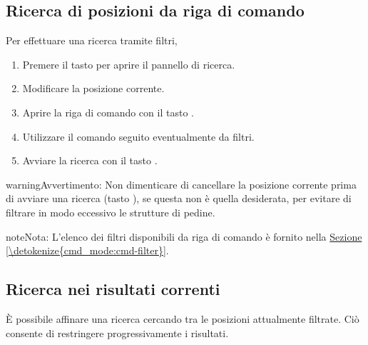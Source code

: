 \documentclass[letterpaper,10pt,italian]{sphinxmanual}
\begin{document}
\subsection{Ricerca di posizioni da riga di comando}
\label{\detokenize{annexe_filtres:recherche-de-positions-en-ligne-de-commande}}
\sphinxAtStartPar
Per effettuare una ricerca tramite filtri,
\begin{enumerate}
%
\item {} 
\sphinxAtStartPar
Premere il tasto  per aprire il pannello di ricerca.

\item {} 
\sphinxAtStartPar
Modificare la posizione corrente.

\item {} 
\sphinxAtStartPar
Aprire la riga di comando con il tasto .

\item {} 
\sphinxAtStartPar
Utilizzare il comando  seguito eventualmente da filtri.

\item {} 
\sphinxAtStartPar
Avviare la ricerca con il tasto .

\end{enumerate}

\begin{sphinxadmonition}{warning}{Avvertimento:}
\sphinxAtStartPar
Non dimenticare di cancellare la posizione corrente prima di avviare una ricerca (tasto ), se questa non è quella desiderata, per evitare di filtrare in modo eccessivo le strutture di pedine.
\end{sphinxadmonition}

\begin{sphinxadmonition}{note}{Nota:}
\sphinxAtStartPar
L’elenco dei filtri disponibili da riga di comando è fornito nella \hyperref[\detokenize{cmd_mode:cmd-filter}]{Sezione \ref{\detokenize{cmd_mode:cmd-filter}}}.
\end{sphinxadmonition}


\subsection{Ricerca nei risultati correnti}
\label{\detokenize{annexe_filtres:recherche-dans-les-resultats-courants}}
\sphinxAtStartPar
È possibile affinare una ricerca cercando tra le posizioni attualmente filtrate. Ciò consente di restringere progressivamente i risultati.
\end{document}
